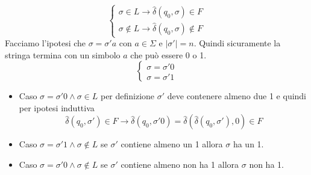 \documentclass[a4paper]{article}
\begin{document}
{\begin{itemize}
\[\begin{cases}
            \sigma \in L \rightarrow \hat{\delta}(q_0, \sigma) \in F\\
        \sigma \notin L \rightarrow \hat{\delta}(q_0, \sigma) \notin F
        \end{cases}\]
        Facciamo l'ipotesi che $\sigma = \sigma' a$ con $a \in \Sigma$ e $|\sigma'| = n$.
        Quindi sicuramente la stringa termina con un simbolo $a$ che può essere 0 o 1.
        \[\begin{cases}
            \sigma = \sigma ' 0\\
            \sigma = \sigma ' 1
        \end{cases}\]
        \begin{itemize}
            \item Caso $\sigma = \sigma ' 0 \land \sigma \in L$ per definizione
            $\sigma'$ deve contenere almeno due 1 e quindi per ipotesi induttiva
            \[\hat{\delta}(q_0, \sigma') \in F \rightarrow \hat{\delta}(q_0, \sigma' 0) = \hat{\delta}(\hat{\delta}(q_0, \sigma'), 0) \in F\]
            \item Caso $\sigma = \sigma ' 1 \land \sigma \notin L$ se $\sigma'$ contiene almeno un 1 allora $\sigma$ ha un 1.
            \item Caso $\sigma = \sigma ' 0 \land \sigma \notin L$ se $\sigma'$ contiene almeno non ha 1 allora $\sigma$ non ha 1.
        \end{itemize}
    \end{itemize}
    
}
\end{document}
